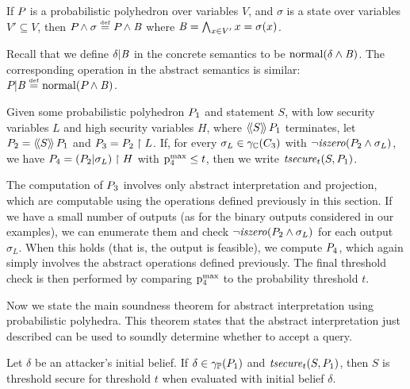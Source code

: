 \begin{notation} If $ \pp{} $ is a probabilistic polyhedron over
  variables $ V $, and $ \sigma $ is a state over variables $ V'
  \subseteq V $, then $ \absdcond{\pp{}}{\sigma} \defeq
  \absdcond{\pp{}}{\bexp} $ where $ \bexp = \bigwedge_{x \in V'} x =
  \sigma(x) $.
\end{notation}

Recall that we define $\drevise{\delta}{\bexp}$ in the concrete
semantics to be $\normal{\dcond{\delta}{\bexp}}$.  The
corresponding operation in the abstract semantics is similar:
$\absdrevise{\pp{}}{\bexp} \defeq \normal{\absdcond{\pp{}}{\bexp}}$.

\begin{definition} \label{def:poly-threshold}
Given some probabilistic polyhedron $\pp{1}$ and statement $S$, with
low security variables $ L $ and high security variables $ H $, where
$\abspevalp{S}{\pp{1}} $ terminates, let $\pp{2} =
\abspevalp{S}{\pp{1}}$ and $\pp{3} = \project{\pp{2}}{L}$. If, for
every $ \sigma_L \in \pconc{\getpoly{3}} $ with $
\neg\iszero{\absdcond{\pp{2}}{\sigma_L}}$, we have $ \pp{4} =
\project{\paren{\absdrevise{\pp{2}}{\sigma_L}}}{H} $ with $\pmax{4}
\leq t$, then we write $\abspolicy{S}{\pp{1}}{t}$.
\end{definition}

The computation of $\pp{3}$ involves only abstract interpretation and
projection, which are computable using the operations defined previously
in this section.  If we have a small number of outputs (as for the binary outputs
considered in our examples), we can enumerate them and check
$\neg\iszero{\absdcond{\pp{2}}{\sigma_L}}$ for each output $\sigma_L$.
When this holds (that is, the output is feasible), we compute $\pp{4}$,
which again simply involves the abstract operations defined previously.
The final threshold check is then performed by comparing $\pmax{4}$ to
the probability threshold $t$.

Now we state the main soundness theorem for abstract interpretation
using probabilistic polyhedra.  This theorem states that the abstract
interpretation just described can be used to soundly determine whether
to accept a query.

\begin{theorem} \label{thm:pp:secure}
  Let $\delta$ be an attacker's initial belief.  If $\delta \in
  \ppconc{\pp{1}}$ and $\abspolicy{S}{\pp{1}}{t}$, then $S$ is threshold secure
  for threshold $t$ when evaluated with initial belief $\delta$.
\end{theorem}

